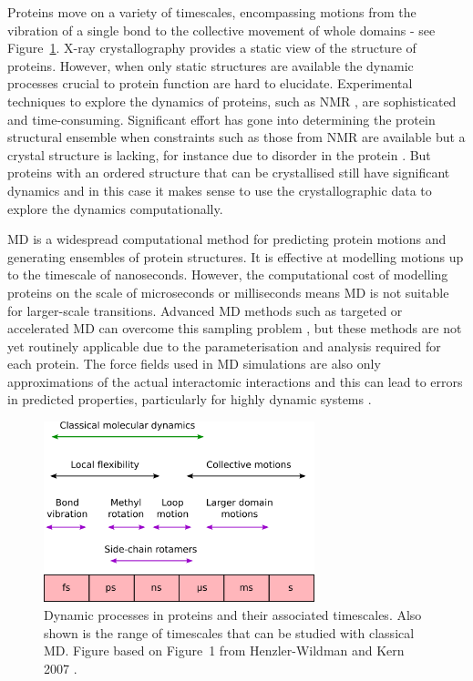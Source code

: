 Proteins move on a variety of timescales, encompassing motions from the vibration of a single bond to the collective movement of whole domains \cite{Henzler-Wildman2007, Wei2016} - see Figure~\ref{fig:timescales}.
X-ray crystallography provides a static view of the structure of proteins.
However, when only static structures are available the dynamic processes crucial to protein function \cite{Henzler-Wildman2007a} are hard to elucidate.
Experimental techniques to explore the dynamics of proteins, such as NMR \cite{Sormanni2017}, are sophisticated and time-consuming.
Significant effort has gone into determining the protein structural ensemble when constraints such as those from NMR are available but a crystal structure is lacking, for instance due to disorder in the protein \cite{Bonomi2017}.
But proteins with an ordered structure that can be crystallised still have significant dynamics and in this case it makes sense to use the crystallographic data to explore the dynamics computationally.

MD is a widespread computational method for predicting protein motions and generating ensembles of protein structures.
It is effective at modelling motions up to the timescale of nanoseconds.
However, the computational cost of modelling proteins on the scale of microseconds or milliseconds means MD is not suitable for larger-scale transitions.
Advanced MD methods such as targeted or accelerated MD can overcome this sampling problem \cite{Maximova2016, Ho2009}, but these methods are not yet routinely applicable due to the parameterisation and analysis required for each protein.
The force fields used in MD simulations are also only approximations of the actual interactomic interactions and this can lead to errors in predicted properties, particularly for highly dynamic systems \cite{Palazzesi2015}.


\begin{figure}
\centering

\includegraphics[width=0.7\textwidth]{figures/timescales/timescales}

\caption[Timescales of protein motions]
{Dynamic processes in proteins and their associated timescales.
Also shown is the range of timescales that can be studied with classical MD.
Figure based on Figure~1 from Henzler-Wildman and Kern 2007 \cite{Henzler-Wildman2007}.}

\label{fig:timescales}
\end{figure}


